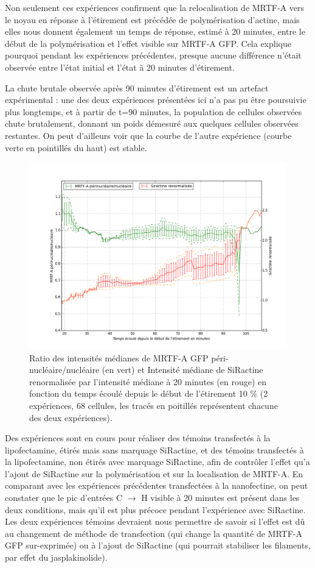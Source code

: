 Non seulement ces expériences confirment que la relocalisation de MRTF-A vers le noyau en réponse à l'étirement est précédée de polymérisation d'actine, mais elles nous donnent également un temps de réponse, estimé à 20 minutes, entre le début de la polymérisation et l'effet visible sur MRTF-A GFP. Cela explique pourquoi pendant les expériences précédentes, presque aucune différence n'était observée entre l'état initial et l'état à 20 minutes d'étirement.

La chute brutale observée après 90 minutes d'étirement est un artefact expérimental : une des deux expériences présentées ici n'a pas pu être poursuivie plus longtemps, et à partir de t=90 minutes, la population de cellules observées chute brutalement, donnant un poids démesuré aux quelques cellules observées restantes. On peut d'ailleurs voir que la courbe de l'autre expérience (courbe verte en pointillés du haut) est stable. 

\begin{figure}
\includegraphics[scale=0.4]{Figures/C2C12.png} 
\caption{Ratio des intensités médianes de MRTF-A GFP péri-nucléaire/nucléaire (en vert) et Intensité médiane de SiRactine renormalisée par l'intensité médiane à 20 minutes (en rouge)  en fonction du temps écoulé depuis le début de l'étirement 10 \% (2 expériences, 68 cellules, les tracés en poitillés représentent chacune des deux expériences).\label{Siractine_quantif}}
\end{figure}
 
Des expériences sont en cours pour réaliser des témoins transfectés à la lipofectamine, étirés mais sans marquage SiRactine, et des témoins transfectés à la lipofectamine, non étirés avec marquage SiRactine, afin de contrôler l'effet qu'a l'ajout de SiRactine sur la polymérisation et sur la localisation de MRTF-A. 
En comparant avec les expériences précédentes transfectées à la nanofectine, on peut constater que le pic d'entrées C $\rightarrow$ H visible à 20 minutes est présent dans les deux conditions, mais qu'il est plus précoce pendant l'expérience avec SiRactine. Les deux expériences témoins devraient nous permettre de savoir si l'effet est dû au changement de méthode de transfection (qui change la quantité de MRTF-A GFP sur-exprimée) ou à l'ajout de SiRactine (qui pourrait stabiliser les filaments, par effet du jasplakinolide). 
 
